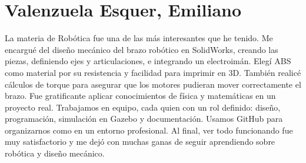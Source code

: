 \section{Valenzuela Esquer, Emiliano}

La materia de Robótica fue una de las más interesantes que he tenido. Me encargué del diseño mecánico del brazo robótico en SolidWorks, creando las piezas, definiendo ejes y articulaciones, e integrando un electroimán. Elegí ABS como material por su resistencia y facilidad para imprimir en 3D. También realicé cálculos de torque para asegurar que los motores pudieran mover correctamente el brazo. Fue gratificante aplicar conocimientos de física y matemáticas en un proyecto real. Trabajamos en equipo, cada quien con un rol definido: diseño, programación, simulación en Gazebo y documentación. Usamos GitHub para organizarnos como en un entorno profesional. Al final, ver todo funcionando fue muy satisfactorio y me dejó con muchas ganas de seguir aprendiendo sobre robótica y diseño mecánico.
